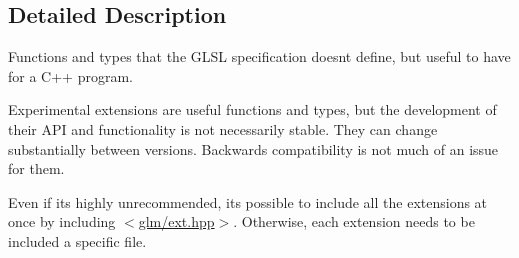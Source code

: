 \subsection{Detailed Description}
Functions and types that the G\+L\+SL specification doesn\textquotesingle{}t define, but useful to have for a C++ program. 

Experimental extensions are useful functions and types, but the development of their A\+PI and functionality is not necessarily stable. They can change substantially between versions. Backwards compatibility is not much of an issue for them.

Even if it\textquotesingle{}s highly unrecommended, it\textquotesingle{}s possible to include all the extensions at once by including $<$\hyperlink{ext_8hpp}{glm/ext.\+hpp}$>$. Otherwise, each extension needs to be included a specific file. 
